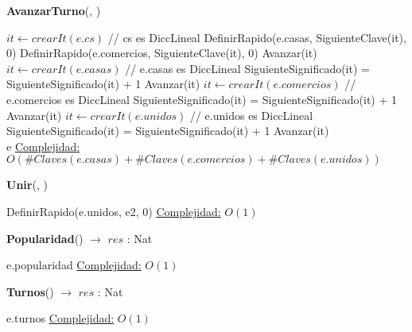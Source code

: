 \begin{Algoritmos}
\begin{algorithm}[H]{\textbf{AvanzarTurno}(, )}
\begin{algorithmic}[1]
    \State $it \gets crearIt(e.cs)$ // cs es DiccLineal
    \State DefinirRapido(e.casas, SiguienteClave(it), 0)
    \EndIf
    \State DefinirRapido(e.comercios, SiguienteClave(it), 0)
    \EndIf
    \State Avanzar(it)
    \EndWhile
    \State $it \gets crearIt(e.casas)$ // e.casas es DiccLineal
    \State SiguienteSignificado(it) = SiguienteSignificado(it) + 1
    \State Avanzar(it)
    \EndWhile
    \State $it \gets crearIt(e.comercios)$ // e.comercios es DiccLineal
    \State SiguienteSignificado(it) = SiguienteSignificado(it) + 1
    \State Avanzar(it)
    \EndWhile
    \State $it \gets crearIt(e.unidos)$ // e.unidos es DiccLineal
    \State SiguienteSignificado(it) = SiguienteSignificado(it) + 1
    \State Avanzar(it)
    \EndWhile\\
    \Return e
    \medskip
    \Statex \underline{Complejidad:} $O(\#Claves(e.casas)+\#Claves(e.comercios) + \#Claves(e.unidos))$
\end{algorithmic}
\end{algorithm}

\begin{algorithm}[H]{\textbf{Unir}(, )}
\begin{algorithmic}[1]
    \State DefinirRapido(e.unidos, e2, 0)
    \medskip
    \Statex \underline{Complejidad:} $O(1)$
\end{algorithmic}
\end{algorithm}

\begin{algorithm}[H]{\textbf{Popularidad}() $\to$ $res$ : Nat} 
\begin{algorithmic}[1]
    \State \Return e.popularidad
    \medskip
    \Statex \underline{Complejidad:} $O(1)$
\end{algorithmic}
\end{algorithm}

\begin{algorithm}[H]{\textbf{Turnos}() $\to$ $res$ : Nat} 
\begin{algorithmic}[1]
    \State \Return e.turnos
    \medskip
    \Statex \underline{Complejidad:} $O(1)$
\end{algorithmic}
\end{algorithm}

  
\end{Algoritmos}


